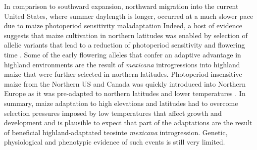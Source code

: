 \documentclass[9pt,twocolumn,twoside,lineno]{BioRxiv}
\begin{document}
In comparison to southward expansion, northward migration into the current United States, where summer daylength is longer, occurred at a much slower pace \cite{Da_Fonseca2015-zh, Swarts2017-ge} due to maize photoperiod sensitivity maladaptation \cite{Hung2012-ms}
Indeed, a host of evidence suggests that maize cultivation in northern latitudes was enabled by selection of allelic variants that lead to a reduction of photoperiod sensitivity and flowering time \cite{Liang2018-af, Guo2018-on, Coles2010-db, Huang2018-ga, Yang2013-lg, Salvi2007-ku, Hung2012-ms}.
Some of the early flowering alleles that confer an adaptive advantage in highland environments are the result of \textit{mexicana} introgressions into highland maize \cite{Guo2018-on} that were further selected in northern latitudes.
Photoperiod insensitive maize from the Northern US and Canada was quickly introduced into Northern Europe as it was pre-adapted to northern latitudes and lower temperatures \cite{Brandenburg2017-ii}.
In summary, maize adaptation to high elevations and latitudes had to overcome selection pressures imposed by low temperatures that affect growth and development and is plausible to expect that part of the adaptations are the result of beneficial highland-adaptated teosinte \textit{mexicana} introgression. 
Genetic, physiological and phenotypic evidence of such events is still very limited.
\end{document}
